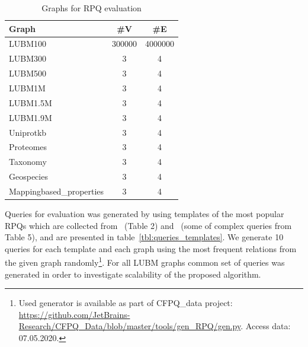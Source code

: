 \begin{table}
\begin{tabular}{|l|c|c|}
\hline
Graph & \#V & \#E \\
\hline
\hline 
LUBM100  & 300000 & 4000000 \\
LUBM300  & 3 & 4 \\
LUBM500  & 3 & 4 \\
LUBM1M   & 3 & 4 \\
LUBM1.5M & 3 & 4 \\
LUBM1.9M & 3 & 4 \\
\hline
Uniprotkb & 3 & 4 \\
Proteomes & 3 & 4 \\
Taxonomy & 3 & 4 \\
\hline
Geospecies & 3 & 4 \\
Mappingbased\_properties & 3 & 4 \\
\hline
\end{tabular}
\caption{Graphs for RPQ evaluation}
\label{tbl:graphs_for_rpq}
\end{table}


Queries for evaluation was generated by using templates of the most popular RPQs which are collected from~
\cite{Pacaci2020RegularPQ} (Table 2) and~\cite{Wang2019} (some of complex queries from Table 5), and are presented in table~\ref{tbl:queries_templates}.
We generate 10 queries for each template and each graph using the most frequent relations from the given graph randomly\footnote{Used generator is available as part of CFPQ\_data project: \url{https://github.com/JetBrains-Research/CFPQ_Data/blob/master/tools/gen_RPQ/gen.py}. Access data: 07.05.2020.}. 
For all LUBM graphs common set of queries was generated in order to investigate scalability of the proposed algorithm.

